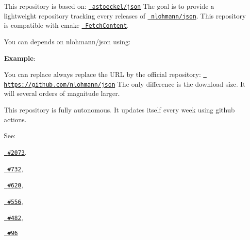 This repository is based on\+: \href{https://github.com/astoeckel/json}{\texttt{ astoeckel/json}} The goal is to provide a lightweight repository tracking every releases of \href{https://github.com/nlohmann/json}{\texttt{ nlohmann/json}}. This repository is compatible with cmake \href{https://cmake.org/cmake/help/v3.11/module/FetchContent.html}{\texttt{ Fetch\+Content}}.

You can depends on nlohmann/json using\+:

{\bfseries{Example}}\+: 
\begin{DoxyCode}{0}
\DoxyCodeLine{}
\DoxyCodeLine{}
\DoxyCodeLine{}

\end{DoxyCode}


You can replace always replace the URL by the official repository\+: \href{https://github.com/nlohmann/json}{\texttt{ https\+://github.\+com/nlohmann/json}} The only difference is the download size. It will several orders of magnitude larger.

This repository is fully autonomous. It updates itself every week using github actions.

See\+:
\begin{DoxyItemize}
\item \href{https://github.com/nlohmann/json/issues/2073}{\texttt{ \#2073}},
\item \href{https://github.com/nlohmann/json/issues/732}{\texttt{ \#732}},
\item \href{https://github.com/nlohmann/json/issues/620}{\texttt{ \#620}},
\item \href{https://github.com/nlohmann/json/issues/556}{\texttt{ \#556}},
\item \href{https://github.com/nlohmann/json/issues/482}{\texttt{ \#482}},
\item \href{https://github.com/nlohmann/json/issues/96}{\texttt{ \#96}} 
\end{DoxyItemize}